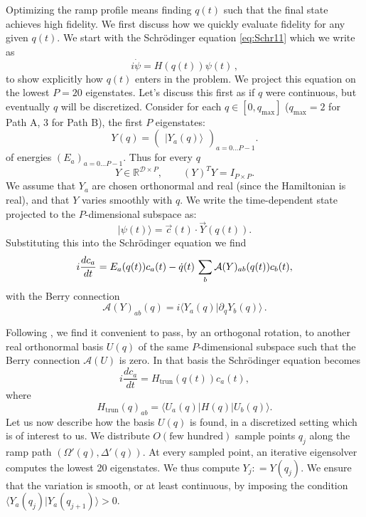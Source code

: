 \documentclass[a4paper,11pt]{article}
\theoremstyle{remark}
\theoremstyle{theorem}
\begin{document}
Optimizing the ramp profile means finding $q (t)$ such that the final state
achieves high fidelity. We first discuss how we quickly evaluate fidelity for any given $q(t)$.
We start with the Schr{\"o}dinger equation
\eqref{eq:Schr11} which we write as
\begin{equation}
	i \dot{\psi} = H (q (t)) \psi (t)\,,
\end{equation}
to show explicitly how $q (t)$ enters in the problem. We project this equation
on the lowest $P = 20$ eigenstates. Let's discuss this first as if $q$ were
continuous, but eventually $q$ will be discretized. Consider for each $q\in [0,q_{\max}]$ ($q_{\max}=2$ for Path A, $3$ for Path B), the first $P$ eigenstates:
\begin{equation}
	Y  (q) = \left(\begin{array}{c}
		|Y_a (q ) \rangle
	\end{array}\right)_{a = 0 \ldots P - 1}  .
\end{equation}
of energies $(E_a)_{a = 0 \ldots P - 1}$. Thus for every $q$
\begin{equation}
	Y   \in \mathbb{R}^{\mathcal{D} \times P}, \qquad (Y ^{})^T Y  = I_{P\times P} .
\end{equation}
We assume that $Y_a$ are chosen orthonormal and real (since the Hamiltonian is
real), and that $Y$ varies smoothly with $q$. We write the time-dependent
state projected to the $P$-dimensional subspace as:
\begin{equation}
	| \psi (t) \rangle = \vec{c} (t) \cdot \vec{Y} (q (t)) .
\end{equation}
Substituting this into the Schr{\"o}dinger equation we find
\begin{equation}
	i \frac{dc_a}{dt} = E_a (q (t)) c_a (t) - \dot{q} (t)  \hspace{0.17em}
	\sum_b \mathcal{A} (Y)_{ab} (q (t)) c_b (t),
\end{equation}
with the Berry connection
\begin{equation}
	\mathcal{A} (Y)_{ab} (q) = i \langle Y_a (q) | \partial_q Y_b (q) \rangle\,.
\end{equation}

Following {\cite{Kato1950}}, we find it convenient to pass, by an orthogonal
rotation, to another real orthonormal basis $U (q)$ of the same
$P$-dimensional subspace such that the Berry connection $\mathcal{A} (U)$ is
zero. In that basis the Schr{\"o}dinger equation becomes
\begin{equation}
	i \frac{dc_a}{dt} = H_{\text{trun}} (q (t))
	c_a (t), \label{SchrHU}
\end{equation}
where
\begin{equation}
	H_{\mathrm{trun}} (q)_{ab} = \langle U_a (q) |H (q) |U_b (q) \rangle .
	\label{HU}
\end{equation}
Let us now describe how the basis $U (q)$ is found, in a discretized setting
which is of interest to us. We distribute $O(\text{few hundred})$ sample points
$q_j$ along the ramp path $(\Omega' (q), \Delta' (q))$.  At every sampled
point, an iterative eigensolver computes the lowest 20 eigenstates. We thus
compute $Y_j : = Y (q_j)$. We ensure that the variation is smooth, or at least
continuous, by imposing the condition $\langle Y_a (q_j) |Y_a (q_{j + 1})
\rangle > 0$.
\end{document}

